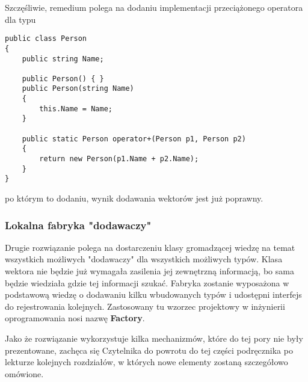Szczęśliwie, remedium polega na dodaniu implementacji przeciążonego operatora dla typu

\begin{scriptsize}
\begin{verbatim}
public class Person
{
    public string Name;

    public Person() { }
    public Person(string Name)
    {
        this.Name = Name;
    }

    public static Person operator+(Person p1, Person p2)
    {
        return new Person(p1.Name + p2.Name);
    }
}
\end{verbatim}
\end{scriptsize}

po którym to dodaniu, wynik dodawania wektorów jest już poprawny.

\subsubsection{Lokalna fabryka "dodawaczy"}

Drugie rozwiązanie polega na dostarczeniu klasy gromadzącej wiedzę na temat wszystkich możliwych "dodawaczy"
dla wszystkich możliwych typów. Klasa wektora nie będzie już wymagała zasilenia jej zewnętrzną informacją, bo
sama będzie wiedziała gdzie tej informacji szukać. Fabryka zostanie wyposażona w podstawową wiedzę o
dodawaniu kilku wbudowanych typów i udostępni interfejs do rejestrowania kolejnych. Zastosowany tu wzorzec projektowy
w inżynierii oprogramowania nosi nazwę {\bf Factory}.

Jako że rozwiązanie wykorzystuje kilka mechanizmów, które do tej pory nie były prezentowane, zachęca się Czytelnika do
powrotu do tej części podręcznika po lekturze kolejnych rozdziałów, w których nowe elementy zostaną szczegółowo
omówione.

